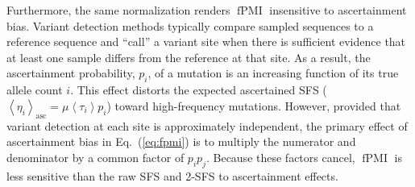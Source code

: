 \documentclass[11pt, letterpaper]{article}   	%
\newcommand{\eq}[1]{Eq.~(\ref{#1})}
\newcommand{\Eq}[1]{Equation~(\ref{#1})}
\newcommand{\E}[1]{\left< #1 \right>}
\DeclareMathOperator{\pmi}{PMI}
\DeclareMathOperator{\fpmi}{fPMI}
\begin{document}
Furthermore, the same normalization renders $\fpmi$ insensitive to ascertainment bias.
Variant detection methods typically compare sampled sequences to a reference sequence and ``call'' a variant site when there is sufficient evidence that at least one sample differs from the reference at that site.
As a result, the ascertainment probability, $p_i$, of a mutation is an increasing function of its true allele count $i$.
This effect distorts the expected ascertained SFS ($\E{\eta_i}_{\text{asc}} = \mu \E{\tau_i} p_i$) toward high-frequency mutations.
However, provided that variant detection at each site is approximately independent, the primary effect of ascertainment bias in \eq{eq:fpmi} is to multiply the numerator and denominator by a common factor of $p_i p_j$.
Because these factors cancel, $\fpmi$ is less sensitive than the raw SFS and 2-SFS to ascertainment effects.

\end{document}
